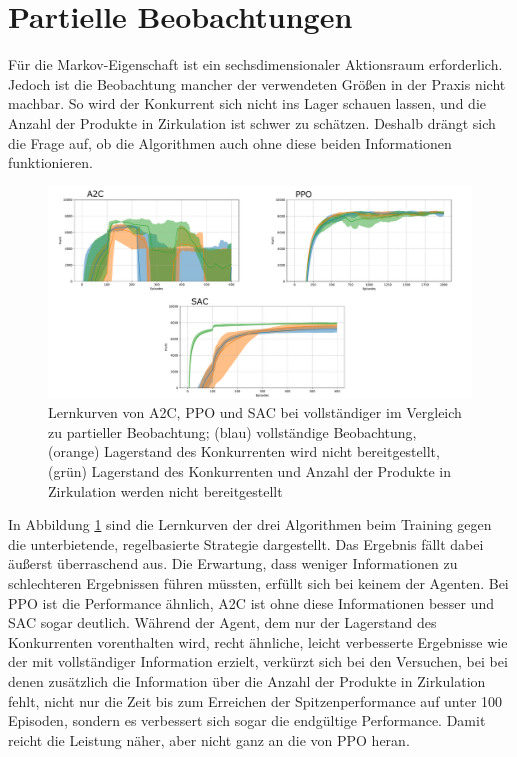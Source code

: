 \section{Partielle Beobachtungen}
Für die Markov-Eigenschaft ist ein sechsdimensionaler Aktionsraum erforderlich.
Jedoch ist die Beobachtung mancher der verwendeten Größen in der Praxis nicht machbar.
So wird der Konkurrent sich nicht ins Lager schauen lassen, und die Anzahl der Produkte in Zirkulation ist schwer zu schätzen.
Deshalb drängt sich die Frage auf, ob die Algorithmen auch ohne diese beiden Informationen funktionieren.

\begin{figure}[htbp]
	\centering
	\includegraphics[width=\textwidth]{main/partial_observation.pdf}
	\caption{Lernkurven von A2C, PPO und SAC bei vollständiger im Vergleich zu partieller Beobachtung; (blau) vollständige Beobachtung, (orange) Lagerstand des Konkurrenten wird nicht bereitgestellt, (grün) Lagerstand des Konkurrenten und Anzahl der Produkte in Zirkulation werden nicht bereitgestellt}
	\label{grafic:PartialObservation}
\end{figure}

In Abbildung \ref{grafic:PartialObservation} sind die Lernkurven der drei Algorithmen beim Training gegen die unterbietende, regelbasierte Strategie dargestellt.
Das Ergebnis fällt dabei äußerst überraschend aus.
Die Erwartung, dass weniger Informationen zu schlechteren Ergebnissen führen müssten, erfüllt sich bei keinem der Agenten.
Bei PPO ist die Performance ähnlich, A2C ist ohne diese Informationen besser und SAC sogar deutlich.
Während der Agent, dem nur der Lagerstand des Konkurrenten vorenthalten wird, recht ähnliche, leicht verbesserte Ergebnisse wie der mit vollständiger Information erzielt, verkürzt sich bei den Versuchen, bei bei denen zusätzlich die Information über die Anzahl der Produkte in Zirkulation fehlt, nicht nur die Zeit bis zum Erreichen der Spitzenperformance auf unter 100 Episoden, sondern es verbessert sich sogar die endgültige Performance.
Damit reicht die Leistung näher, aber nicht ganz an die von PPO heran.

